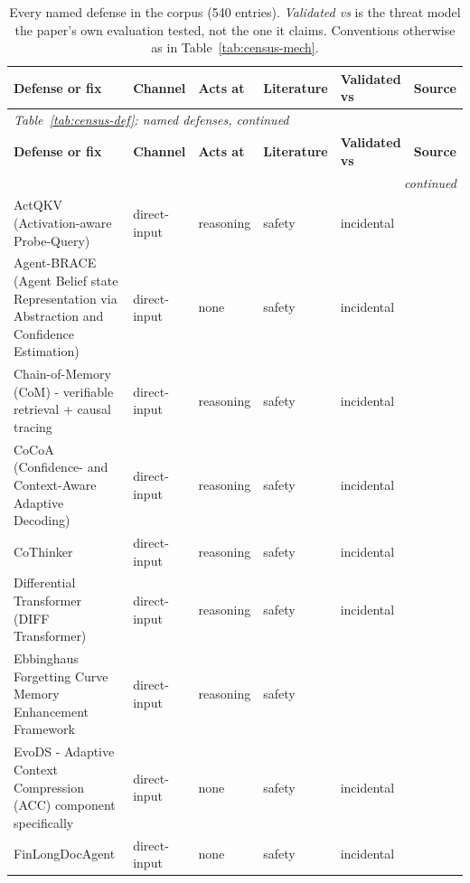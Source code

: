\begingroup
\footnotesize
\setlength{\tabcolsep}{3.5pt}
\begin{longtable}{@{}p{}lllll@{}}
\caption{Every named defense in the corpus (540 entries). \emph{Validated vs} is the threat model the paper's own evaluation tested, not the one it claims. Conventions otherwise as in Table~\ref{tab:census-mech}.}\\
\toprule
\textbf{Defense or fix} & \textbf{Channel} & \textbf{Acts at} & \textbf{Literature} & \textbf{Validated vs} & \textbf{Source} \\
\midrule
\endfirsthead
\multicolumn{6}{l}{\emph{Table~\ref{tab:census-def}: named defenses, continued}} \\
\toprule
\textbf{Defense or fix} & \textbf{Channel} & \textbf{Acts at} & \textbf{Literature} & \textbf{Validated vs} & \textbf{Source} \\
\midrule
\endhead
\midrule
\multicolumn{6}{r}{\emph{continued}} \\
\endfoot
\bottomrule
\endlastfoot
ActQKV (Activation-aware Probe-Query) & direct-input & reasoning & safety & incidental & \cite{xiao-2025-activationaware} \\
Agent-BRACE (Agent Belief state Representation via Abstraction and Confidence Estimation) & direct-input & none & safety & incidental & \cite{singh-2026-agentbrace} \\
Chain-of-Memory (CoM) - verifiable retrieval + causal tracing & direct-input & reasoning & safety & incidental & \cite{jarsania-2025-chainofmemory} \\
CoCoA (Confidence- and Context-Aware Adaptive Decoding) & direct-input & reasoning & safety & incidental & \cite{khandelwal-2025-cocoa} \\
CoThinker & direct-input & reasoning & safety & incidental & \cite{shang-2025-united} \\
Differential Transformer (DIFF Transformer) & direct-input & reasoning & safety & incidental & \cite{ye-2024-differential} \\
Ebbinghaus Forgetting Curve Memory Enhancement Framework & direct-input & reasoning & safety &  & \cite{jiang-2026-ebbinghaus} \\
EvoDS - Adaptive Context Compression (ACC) component specifically & direct-input & none & safety & incidental & \cite{yang-2026-evods} \\
FinLongDocAgent & direct-input & none & safety & incidental & \cite{wang-2026-documentlevel} \\

\end{longtable}
